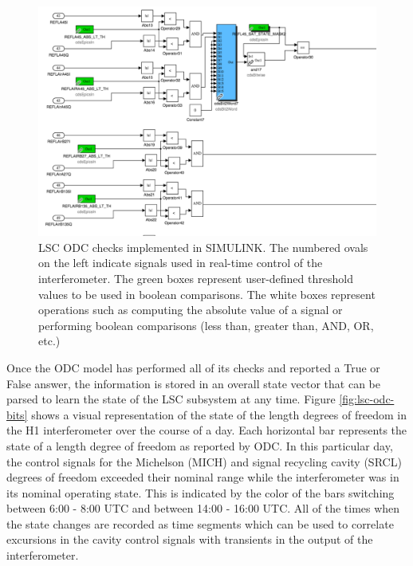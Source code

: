 \begin{figure}[ht!]
\includegraphics[width=\textwidth]{figures/ODC/LSC-ODC-model}
\caption[LSC ODC SIMULINK Model Example]{LSC ODC checks implemented in SIMULINK. %
         The numbered ovals on the left indicate signals used in real-time control %
         of the interferometer. The green boxes represent user-defined threshold %
         values to be used in boolean comparisons. The white boxes represent operations %
         such as computing the absolute value of a signal or performing boolean %
         comparisons (less than, greater than, AND, OR, etc.)}
\end{figure}\label{fig:lsc-odc-model}

Once the ODC model has performed all of its checks and reported a True or False 
answer, the information is stored in an overall state vector that can be parsed to 
learn the state of the LSC subsystem at any time. 
Figure \ref{fig:lsc-odc-bits} shows a visual representation of the state of the 
length degrees of freedom in the H1 interferometer over the course of a day.
Each horizontal bar represents the state of a length degree of freedom as 
reported by ODC. In this particular day, the control signals for the Michelson 
(MICH) and signal recycling cavity (SRCL) degrees of freedom exceeded their 
nominal range while the interferometer was in its nominal operating state. 
This is indicated by the color of the bars switching between 6:00 - 8:00 UTC 
and between 14:00 - 16:00 UTC. All of the times when the state changes are 
recorded as time segments which can be used to correlate excursions in the 
cavity control signals with transients in the output of the interferometer. 

